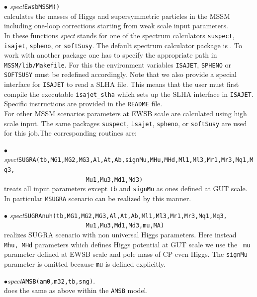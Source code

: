 \documentclass[12pt,a4paper]{article}
\begin{document}
\noindent $\bullet$ {\it spect}\verb|EwsbMSSM()|\\
 calculates the  masses of Higgs  and
supersymmetric particles in the MSSM including one-loop
corrections starting from weak scale input parameters. \\
In these functions {\it spect} stands for one of
the spectrum calculators {\tt suspect}, {\tt isajet},
{\tt spheno}, or {\tt softSusy}.
The  default spectrum calculator package is {\suspect}. To work
with another package one has to specify the appropriate path in
\verb|MSSM/lib/Makefile|. For this  the environment variables
\verb|ISAJET|, \verb|SPHENO| or \verb|SOFTSUSY| must be redefined
accordingly. Note that we also provide a special interface for
\verb|ISAJET| to read a SLHA file. This means that the user must
first compile the executable \verb|isajet_slha| which sets up the  SLHA 
interface in  {\tt ISAJET}. Specific instructions are provided in the \verb|README| file.\\
 

For other MSSM scenarios  parameters at EWSB scale are calculated
using high scale input. The same packages {\tt suspect}, {\tt isajet},
{\tt spheno}, or {\tt softSusy} are used for this job.The corresponding
routines are:

\noindent $\bullet$ {\it
spect}\verb|SUGRA(tb,MG1,MG2,MG3,Al,At,Ab,signMu,MHu,MHd,Ml1,Ml3,Mr1,Mr3,Mq1,Mq3,|\\
\verb|                       Mu1,Mu3,Md1,Md3)|\\
treats  all input parameters except {\tt tb} and {\tt signMu}  as ones
defined at GUT scale. In particular {\tt MSUGRA} scenario can be realized by this manner. 

\noindent $\bullet$ {\it
spect}\verb|SUGRAnuh(tb,MG1,MG2,MG3,Al,At,Ab,Ml1,Ml3,Mr1,Mr3,Mq1,Mq3,|\\
\verb|                       Mu1,Mu3,Md1,Md3,mu,MA)|\\
realizes SUGRA scenario with non universal Higgs parameters. Here instead {\tt
Mhu, MHd} parameters which defines Higgs potential at GUT scale we use the {\tt
mu } parameter defined at EWSB scale and pole mass of CP-even Higgs. The
{\tt signMu} parameter is omitted  because {\tt mu} is defined
explicitly.

\noindent
$\bullet${\it spect}\verb|AMSB(am0,m32,tb,sng)|.\\
does  the same as above within the {\tt AMSB} model.\\


\end{document}
